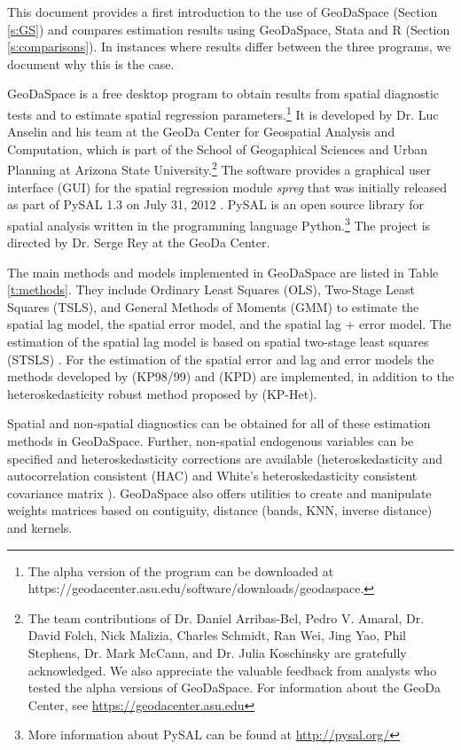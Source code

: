 \documentclass{article}
\begin{document}
This document provides a first introduction to the use of GeoDaSpace (Section \ref{s:GS}) and compares estimation results using GeoDaSpace, Stata and R (Section \ref{s:comparisons}). In instances where results differ between the three programs, we document why this is the case.

GeoDaSpace is a free desktop program to obtain results from spatial diagnostic tests and to estimate spatial regression parameters.\footnote{The alpha version of the program can be downloaded at https://geodacenter.asu.edu/software/downloads/geodaspace.} It is developed by Dr. Luc Anselin and his team at the GeoDa Center for Geospatial Analysis and Computation, which is part of the School of Geogaphical Sciences and Urban Planning at Arizona State University.\footnote{The team contributions of Dr. Daniel Arribas-Bel, Pedro V. Amaral, Dr. David Folch, Nick Malizia, Charles Schmidt, Ran Wei, Jing Yao, Phil Stephens, Dr. Mark McCann, and Dr. Julia Koschinsky are gratefully acknowledged. We also appreciate the valuable feedback from analysts who tested the alpha versions of GeoDaSpace. For information about the GeoDa Center, see  \url{https://geodacenter.asu.edu}} The software provides a graphical user interface (GUI) for the spatial regression module \emph{spreg} that was initially released as part of PySAL 1.3 on July 31, 2012 \citep{Rey07}. PySAL is an open source library for spatial analysis written in the programming language Python.\footnote{More information about PySAL can be found at \url{http://pysal.org/}}  The project is directed by Dr. Serge Rey at the GeoDa Center.

The main methods and models implemented in GeoDaSpace are listed in Table \ref{t:methods}. They include Ordinary Least Squares (OLS), Two-Stage Least Squares (TSLS), and General Methods of Moments (GMM) to estimate the spatial lag model, the spatial error model, and the spatial lag + error model.  The estimation of the spatial lag model is based on spatial two-stage least squares (STSLS) \citep{Anselin88}. For the estimation of the spatial error and lag and error models the methods developed by \citet{Kelejian98,Kelejian99} (KP98/99) and \citet{Drukker10} (KPD) are implemented, in addition to the heteroskedasticity robust method proposed by \citet{Arraiz10} (KP-Het).  

Spatial and non-spatial diagnostics can be obtained for all of these estimation methods in GeoDaSpace. Further, non-spatial endogenous variables can be specified and heteroskedasticity corrections are available (heteroskedasticity and autocorrelation consistent (HAC) \citep{Kelejian07} and White's heteroskedasticity consistent covariance matrix \citep{White80}). GeoDaSpace also offers utilities to create and manipulate weights matrices based on contiguity, distance (bands, KNN, inverse distance) and kernels.
\end{document}
